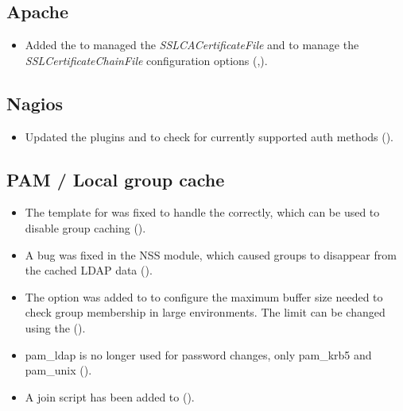 \subsection{Apache}
\begin{itemize}
\item Added the  to managed the
  \emph{SSLCACertificateFile} and
   to manage the
  \emph{SSLCertificateChainFile} configuration options (,).
\end{itemize}

\subsection{Nagios}
\begin{itemize}
\item Updated the plugins  and
   to check for currently
  supported auth methods ().
\end{itemize}




\subsection{PAM / Local group cache}
\begin{itemize}
\item The template for  was fixed to
  handle the  correctly, which can be used to
  disable group caching ().

\item A bug was fixed in the  NSS
  module, which caused groups to disappear from the cached LDAP data
  ().

\item The option  was added to 
  to configure the maximum buffer size needed to check group
  membership in large environments. The limit can be changed using the
   ().

\item pam\_ldap is no longer used for password changes, only
  pam\_krb5 and pam\_unix ().

\item A join script has been added to 
  ().
\end{itemize}


